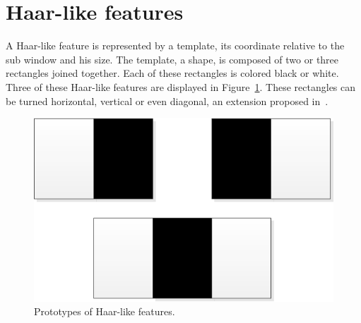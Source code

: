 \documentclass{article}
\begin{document}
%

\section{Haar-like features}

A Haar-like feature is represented by a template, its coordinate relative to the sub window and his size.
The template, a shape, is composed of two or three rectangles joined together. Each of these rectangles is colored black or white. Three of these Haar-like features are displayed in Figure~\ref{fig:features}. These rectangles can be turned horizontal, vertical or even  diagonal, an extension proposed in~\cite{lienhart2002extended}.

\begin{figure}[H]
	\centering
	\includegraphics[scale=0.6]{Features.png}
	\caption{Prototypes of Haar-like features.}
	\label{fig:features}
\end{figure}
\end{document}
